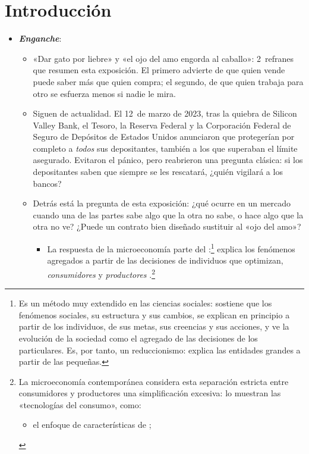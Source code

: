 \documentclass[11pt]{article}
\begin{document}
\tceetitulo

\section*{Introducción}

\begin{itemize}
\item \textbf{\emph{Enganche}}:
  \begin{itemize}
  \item «Dar gato por liebre» y «el ojo del amo engorda al caballo»: 2~refranes que resumen esta exposición. El primero advierte de que quien vende puede saber más que quien compra; el segundo, de que quien trabaja para otro se esfuerza menos si nadie le mira.
  \item Siguen de actualidad. El 12~de marzo de 2023, tras la quiebra de Silicon Valley Bank, el Tesoro, la Reserva Federal y la Corporación Federal de Seguro de Depósitos de Estados Unidos anunciaron que protegerían por completo a \emph{todos} sus depositantes, también a los que superaban el límite asegurado\nocite{TreasuryFedFDIC2023Joint}. Evitaron el pánico, pero reabrieron una pregunta clásica: si los depositantes saben que siempre se les rescatará, ¿quién vigilará a los bancos?
  \item Detrás está la pregunta de esta exposición: ¿qué ocurre en un mercado cuando una de las partes sabe algo que la otra no sabe, o hace algo que la otra no ve? ¿Puede un contrato bien diseñado sustituir al «ojo del amo»?
    \begin{itemize}
    \item La respuesta de la microeconomía parte del :\footnote{Es un método muy extendido en las ciencias sociales: sostiene que los fenómenos sociales, su estructura y sus cambios, se explican en principio a partir de los individuos, de sus metas, sus creencias y sus acciones, y ve la evolución de la sociedad como el agregado de las decisiones de los particulares. Es, por tanto, un reduccionismo: explica las entidades grandes a partir de las pequeñas.} explica los fenómenos agregados a partir de las decisiones de individuos que optimizan, \emph{consumidores} y \emph{productores} .\footnote{La microeconomía contemporánea considera esta separación estricta entre consumidores y productores una simplificación excesiva\nocite{EkelundHebert2013History}: lo muestran las «tecnologías del consumo», como:
\begin{itemize}
\item el enfoque de características de ;

\end{itemize}}
\end{itemize}
\end{itemize}
\end{itemize}
\end{document}
